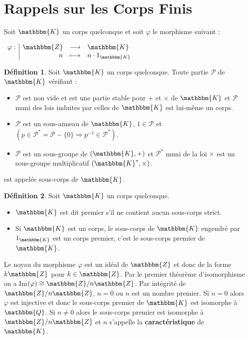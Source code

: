 \documentclass[12pt]{article}
\theoremstyle{remark}\newtheorem{note}{Note}
\theoremstyle{remark}\newtheorem{nota}{Notation}
\newcommand{\Z}{\mathbbm{Z}}
\newcommand{\Q}{\mathbbm{Q}}
\newcommand{\K}{\mathbbm{K}}
\theoremstyle{definition}
\newtheorem{definition}{Définition}
\begin{document}

\tableofcontents
\pagebreak


\section{Rappels sur les Corps Finis} 
Soit $\K$ un corps quelconque et soit $\varphi$ le morphisme suivant :
\begin{center}
$
\begin{array}{l|rcl}
\varphi : & \Z & \longrightarrow & \K \\
    & n & \longmapsto & n\cdot 1_{\K}
\end{array}
$
\end{center}
\vspace{12pt}
\begin{definition}
Soit $\K$ un corps quelconque. Toute partie $\mathcal{P}$ de $\K$ vérifiant :
\begin{itemize}
\item $\mathcal{P}$ est non vide et est une partie stable pour $+$ et $\times$ de $\K$ et $\mathcal{P}$ muni des lois induites par celles de $\K$ est lui-même un corps.
\item $\mathcal{P}$ est un sous-anneau de $\K$, $1 \in \mathcal{P}$ et $(p \in \mathcal{P}^{*} = \mathcal{P} - \{0 \} \Rightarrow p^{-1} \in \mathcal{P}^{*})$.
\item $\mathcal{P}$ est un sous-groupe de $(\K, +)$ et $\mathcal{P}^{*}$ muni de la loi $\times$ est un sous-groupe multiplicatif $(\K^{*}, \times)$.
\end{itemize}
est appelée sous-corps de $\K$.
\end{definition}
\vspace{12pt}
\begin{definition}
Soit $\K$ un corps quelconque.
\begin{itemize}
\item $\K$ est dit premier s'il ne contient aucun sous-corps strict.
\item Si $\K$ est un corps, le sous-corps de $\K$ engendré par $1_{\mathbbm{K}}$ est un corps premier, c'est le sous-corps premier de $\K$.
\end{itemize}
\end{definition}
\vspace{12pt}
Le noyau du morphisme $\varphi$ est un idéal de $\Z$ et donc de la forme $k\Z$ pour $k \in \Z$. Par le premier théorème d'isomorphisme on a Im$(\varphi) \cong \Z / n \Z$. Par intégrité de $\Z / n \Z$, $n=0$ ou $n$ est un nombre premier. Si $n=0$ alors $\varphi$ est injective et donc le sous-corps premier de $\K$ est isomorphe à $\Q$. Si $n \neq 0$ alors le sous-corps premier est isomorphe à $\Z / n \Z$ et $n$ s'appelle la \textbf{caractéristique} de $\K$. 
\\
\end{document}
